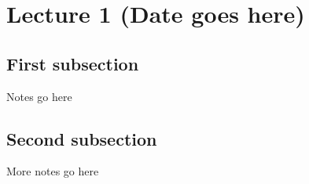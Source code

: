 
\section[Lecture 1 (Date) -- {\it Short title for this lecture}]{Lecture 1 (Date goes here)}

\subsection{First subsection}
Notes go here

\subsection{Second subsection}
More notes go here